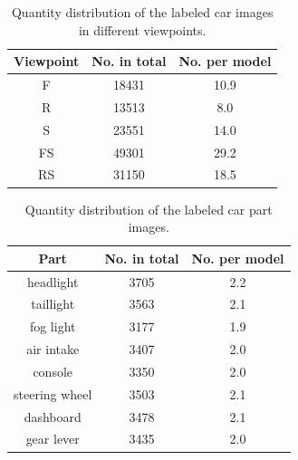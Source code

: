 \documentclass[10pt,twocolumn,letterpaper]{article}
\begin{document}
%
%


\begin{table}
\small
\centering
\caption{Quantity distribution of the labeled car images in different viewpoints.}
\begin{tabular}{*{3}{|c}|}
\hline
Viewpoint & No. in total  & No. per model \\
\hline
F & 18431 & 10.9\\
\hline
R & 13513 & 8.0\\
\hline
S & 23551 & 14.0\\
\hline
FS & 49301 & 29.2\\
\hline
RS & 31150 & 18.5\\
\hline
\end{tabular}
\label{tab:dist_view}
\vspace{-3pt}
\end{table}

\begin{table}
\small
\centering
\caption{Quantity distribution of the labeled car part images.}
\begin{tabular}{*{3}{|c}|}
\hline
Part & No. in total  & No. per model \\
\hline
headlight & 3705 &	2.2  \\
 \hline
 taillight & 3563 & 2.1 \\
 \hline
 fog light & 3177 &	1.9  \\
 \hline
 air intake & 3407 & 2.0	 \\
 \hline
 console & 3350 &	2.0  \\
 \hline
 steering wheel & 3503 & 2.1 \\
 \hline
 dashboard & 3478 &	2.1  \\
 \hline
 gear lever & 3435 & 2.0 \\
\hline

\end{tabular}
\label{tab:dist_part}
\vspace{-3pt}
\end{table}
\end{document}
